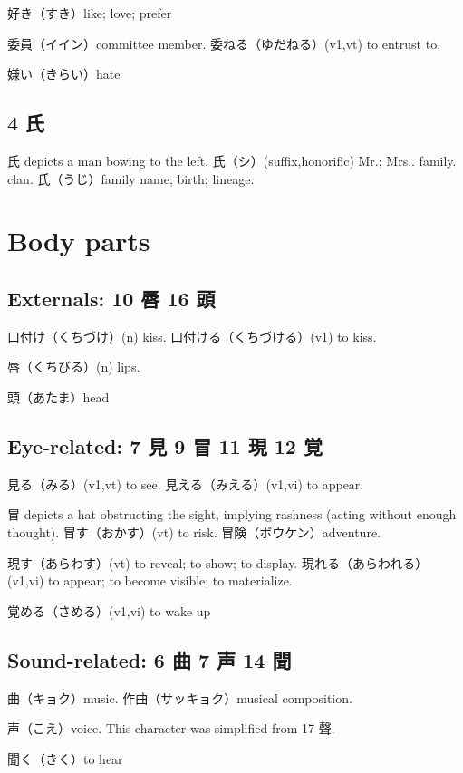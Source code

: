 好き（すき）like; love; prefer

委員（イイン）committee member.
委ねる（ゆだねる）(v1,vt) to entrust to.

嫌い（きらい）hate

\subsection{4 氏}

氏 depicts a man bowing to the left.
氏（シ）(suffix,honorific) Mr.; Mrs.. family. clan.
氏（うじ）family name; birth; lineage.

\section{Body parts}

\subsection{Externals: 10 唇 16 頭}

口付け（くちづけ）(n) kiss.
口付ける（くちづける）(v1) to kiss.

唇（くちびる）(n) lips.

頭（あたま）head

\subsection{Eye-related: 7 見 9 冒 11 現 12 覚}

見る（みる）(v1,vt) to see.
見える（みえる）(v1,vi) to appear.

冒 depicts a hat obstructing the sight, implying rashness
(acting without enough thought).
冒す（おかす）(vt) to risk.
冒険（ボウケン）adventure.

現す（あらわす）(vt) to reveal; to show; to display.
現れる（あらわれる）(v1,vi) to appear; to become visible; to materialize.

覚める（さめる）(v1,vi) to wake up

\subsection{Sound-related: 6 曲 7 声 14 聞}

曲（キョク）music.
作曲（サッキョク）musical composition.

声（こえ）voice.
This character was simplified from 17 聲.

聞く（きく）to hear

